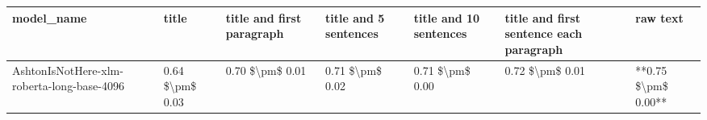 \begin{tabular}{lllllll}
\toprule
                                model\_name &           title & title and first paragraph & title and 5 sentences & title and 10 sentences & title and first sentence each paragraph &            raw text \\
\midrule
AshtonIsNotHere-xlm-roberta-long-base-4096 & 0.64 \$\textbackslash pm\$ 0.03 &           0.70 \$\textbackslash pm\$ 0.01 &       0.71 \$\textbackslash pm\$ 0.02 &        0.71 \$\textbackslash pm\$ 0.00 &                         0.72 \$\textbackslash pm\$ 0.01 & **0.75 \$\textbackslash pm\$ 0.00** \\
\bottomrule
\end{tabular}
